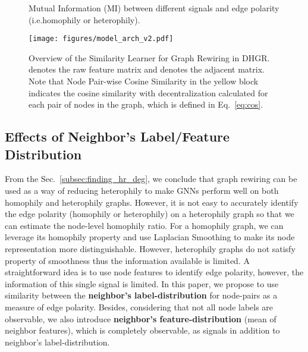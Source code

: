 \documentclass[sigconf]{acmart}
\begin{document}
	\begin{figure}[h]
		\begin{minipage}[t]{0.33\linewidth}
			\centering
		\end{minipage}\begin{minipage}[t]{0.33\linewidth}
			\centering
		\end{minipage}
		\begin{minipage}[t]{0.33\linewidth}
			\centering
		\end{minipage}
		\caption{Mutual Information (MI) between different signals and edge polarity (i.e.homophily or heterophily).}
		
		\label{fig:mi_valid}
	\end{figure}
	\begin{figure*}[h]
		\centering
		\texttt{[image: figures/model\_arch\_v2.pdf]}
		\caption{Overview of the Similarity Learner for Graph Rewiring in DHGR.  denotes the raw feature matrix and  denotes the adjacent matrix. Note that Node Pair-wise Cosine Similarity in the yellow block indicates the cosine similarity with decentralization calculated for each pair of nodes in the graph, which is defined in Eq.~\ref{eq:cos}.}
		\label{fig:model}
\end{figure*}
	
    \subsection{Effects of Neighbor's Label/Feature Distribution}
	\label{subsec:finding_mi}
	From the Sec.~\ref{subsec:finding_hr_deg}, we conclude that graph rewiring can be used as a way of reducing heterophily to make GNNs perform well on both homophily and heterophily graphs. However, it is not easy to accurately identify the edge polarity (homophily or heterophily) on a heterophily graph so that we can estimate the node-level homophily ratio. For a homophily graph, we can leverage its homophily property and use Laplacian Smoothing \cite{smooth1, smooth2} to make its node representation more distinguishable. However, heterophily graphs do not satisfy property of smoothness thus the information available is limited. A straightforward idea is to use node features to identify edge polarity, however, the information of this single signal is limited.
	In this paper, we propose to use similarity between the \textbf{neighbor's label-distribution} for node-pairs as a measure of edge polarity. Besides, considering that not all node labels are observable, we also introduce \textbf{neighbor's feature-distribution} (mean of neighbor features), which is completely observable, as signals in addition to neighbor's label-distribution. 
	
\end{document}
